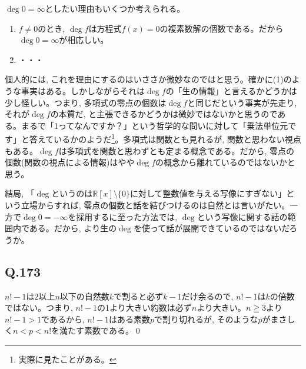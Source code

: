 \documentclass[twocolumn]{jbook}
\theoremstyle{definition}
\newcommand{\ben}{\begin{enumerate}}
\newcommand{\een}{\end{enumerate}}
\newcommand{\mb}{\mathbb}
\renewcommand{\geq}{\geqq}
\begin{document}
$\deg{0} = \infty$としたい理由もいくつか考えられる。
\ben
\item $f\neq 0$のとき, $\deg{f}$は方程式$f(x) = 0$の複素数解の個数である。だから$\deg{0} = \infty$が相応しい。
\item ・・・
\een
個人的には, これを理由にするのはいささか微妙なのではと思う。確かに(1)のような事実はある。しかしながらそれは$\deg{f}$の「生の情報」と言えるかどうかは少し怪しい。つまり, 多項式の零点の個数は$\deg{f}$と同じだという事実が先走り, それが$\deg{f}$の本質だ, と主張できるかどうかは微妙ではないかと思うのである。まるで「1ってなんですか？」という哲学的な問いに対して「乗法単位元です」と答えているかのようだ\footnote{実際に見たことがある。}。多項式は関数とも見れるが, 関数と思わない視点もある。$\deg{f}$は多項式を関数と思わずとも定まる概念である。だから, 零点の個数(関数の視点による情報)はやや$\deg{f}$の概念から離れているのではないかと思う。\par
結局, 「$\deg{}$というのは$\mb{R}[x]\setminus{\{ 0 \}}$に対して整数値を与える写像にすぎない」という立場からすれば, 零点の個数と話を結びつけるのは自然とは言いがたい。一方で$\deg{0} = -\infty$を採用するに至った方法では, $\deg{}$という写像に関する話の範囲内である。だから, より生の$\deg{}$を使って話が展開できているのではないだろうか。

\subsection{Q.173}
$n! - 1$は$2$以上$n$以下の自然数$k$で割ると必ず$k-1$だけ余るので, $n!-1$は$k$の倍数ではない。つまり, $n!-1$の1より大きい約数は必ず$n$より大きい。$n\geq 3$より$n!-1>1$であるから, $n!-1$はある素数$p$で割り切れるが, そのような$p$がまさしく$n < p < n!$を満たす素数である。\qed
\end{document}
